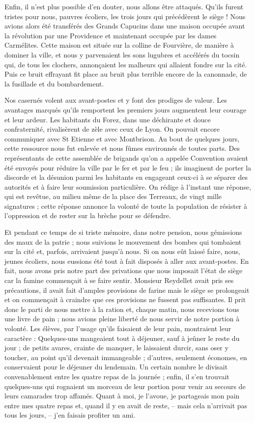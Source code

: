 \documentclass[11pt,a4paper]{report}
\begin{document}
Enfin, il n'est plus possible d'en douter, nous allons être attaqués. Qu'ils furent tristes pour nous, pauvres écoliers, les trois jours qui précédèrent le siège ! Nous avions alors été transférés des Grands Capucins dans une maison occupée avant la révolution par une Providence et maintenant occupée par les dames Carmélites. Cette maison est située sur la colline de Fourvière, de manière à dominer la ville, et nous y parvenaient les sons lugubres et accélérés du tocsin qui, de tous les clochers, annonçaient les malheurs qui allaient fondre sur la cité. Puis ce bruit effrayant fit place au bruit plus terrible encore de la canonnade, de la fusillade et du bombardement.

Nos casernés volent aux avant-postes et y font des prodiges de valeur. Les avantages marqués qu'ils remportent les premiers jours augmentent leur courage et leur ardeur. Les habitants du Forez, dans une déchirante et douce confraternité, rivalisèrent de zèle avec ceux de Lyon. On pouvait encore communiquer avec St Etienne et avec Montbrison. Au bout de quelques jours, cette ressource nous fut enlevée et nous fûmes environnés de toutes parts. Des représentants de cette assemblée de brigands qu'on a appelée Convention avaient été envoyés pour réduire la ville par le fer et par le feu ; ils imaginent de porter la discorde et la désunion parmi les habitants en engageant ceux-ci à se séparer des autorités et à faire leur soumission particulière. On rédige à l'instant une réponse, qui est revêtue, au milieu même de la place des Terreaux, de vingt mille signatures ; cette réponse annonce la volonté de toute la population de résister à l'oppression et de rester sur la brèche pour se défendre.

Et pendant ce temps de si triste mémoire, dans notre pension, nous gémissions des maux de la patrie ; nous suivions le mouvement des bombes qui tombaient sur la cité et, parfois, arrivaient jusqu'à nous. Si on nous eût laissé faire, nous, jeunes écoliers, nous eussions été tout à fait disposés à aller aux avant-postes. En fait, nous avons pris notre part des privations que nous imposait l'état de siège car la famine commençait à se faire sentir. Monsieur Reydellet avait pris ses précautions, il avait fait d'amples provisions de farine mais le siège se prolongeait et on commençait à craindre que ces provisions ne fussent pas suffisantes. Il prit donc le parti de nous mettre à la ration et, chaque matin, nous recevions tous une livre de pain ; nous avions pleine liberté de nous servir de notre portion à volonté. Les élèves, par l'usage qu'ils faisaient de leur pain, montraient leur caractère : Quelques-uns mangeaient tout à déjeuner, sauf à jeûner le reste du jour ; de petits avares, crainte de manquer, le laissaient durcir, sans oser y toucher, au point qu'il devenait immangeable ; d'autres, seulement économes, en conservaient pour le déjeuner du lendemain. Un certain nombre le divisait convenablement entre les quatre repas de la journée ; enfin, il s'en trouvait quelques-uns qui rognaient un morceau de leur portion pour venir au secours de leurs camarades trop affamés. Quant à moi, je l'avoue, je partageais mon pain entre mes quatre repas et, quand il y en avait de reste, -- mais cela n'arrivait pas tous les jours, -- j'en faisais profiter un ami.
\end{document}

